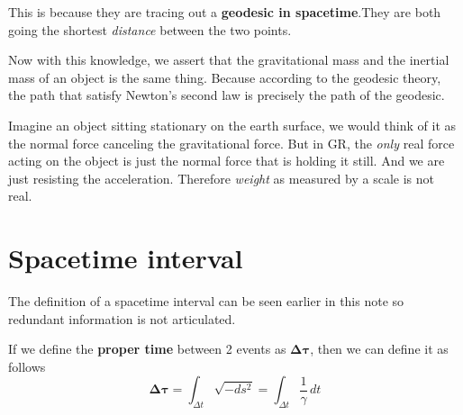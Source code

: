 \documentclass[12pt]{book}
\begin{document}
This is because they are tracing out a \textbf{geodesic in spacetime}.They are both going the shortest \textit{distance} between the two points. 

Now with this knowledge, we assert that the gravitational mass and the inertial mass of an object is the same thing. Because according to the geodesic theory, the path that satisfy Newton's second law is precisely the path of the geodesic. 

Imagine an object sitting stationary on the earth surface, we would think of it as the normal force canceling the gravitational force. But in GR, the \textit{only} real force acting on the object is just the normal force that is holding it still. And we are just resisting the acceleration. Therefore \textit{weight} as measured by a scale is not real. 

\section{Spacetime interval}
The definition of a spacetime interval can be seen earlier in this note so redundant information is not articulated. 

If we define the \textbf{proper time} between 2 events as $\boldsymbol\Delta\boldsymbol\tau$, then we can define it as follows
\[
\boldsymbol\Delta\boldsymbol\tau = \int_{\Delta t }\sqrt{-ds^2} =\int_{\Delta t} \frac{1}{\gamma}\,dt
\]







        
\end{document}
